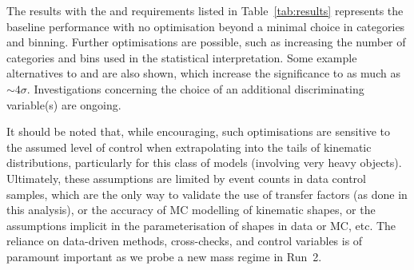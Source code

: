 The results with the \scalht and \alphat requirements listed in 
Table~\ref{tab:results} represents 
the baseline performance with no optimisation beyond a minimal choice
in categories and binning. Further optimisations are possible, such as
increasing the number of categories and bins used in the statistical
interpretation. Some example alternatives to \scalht and \alphat are
also shown, which increase the significance to as much as
$\sim4\sigma$. Investigations concerning the choice of an additional
discriminating variable(s) are ongoing.

It should be noted that, while encouraging, such optimisations are
sensitive to the assumed level of control when extrapolating into the
tails of kinematic distributions, particularly for this class of
models (involving very heavy objects). Ultimately, these assumptions
are limited by event counts in data control samples, which are the
only way to validate the use of transfer factors (as done in this
analysis), or the accuracy of MC modelling of kinematic shapes, or the
assumptions implicit in the parameterisation of shapes in data or MC,
etc. The reliance on data-driven methods, cross-checks, and control
variables is of paramount important as we probe a new mass regime in
Run~2.


